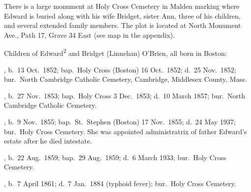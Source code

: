 There is a large monument at Holy Cross Cemetery in Malden marking where Edward is buried along with his wife Bridget, sister Ann, three of his children, and several extended family members. The plot is located at North Monument Ave., Path 17, Grave 34 East (see map in the appendix).\cite{Edward2OBrienGrave,CarolGordon}

\begin{KidsIntro}
	Children of Edward\textsuperscript{2} and Bridget (Linnehan) O'Brien, all born in Boston:
\end{KidsIntro}

\begin{Kids}
	, b.\ 13 Oct.\ 1852;\cite{MaryAnn3OBrienBirth} bap.\ Holy Cross (Boston) 16 Oct.\ 1852;\cite{MaryAnn3OBrienBaptism} d.\ 25 Nov.\ 1852;\cite{MaryAnn3OBrienDeath} bur.\ North Cambridge Catholic Cemetery, Cambridge, Middlesex County, Mass.\cite{DianaBerberenaLetter1}
	
	, b.\ 27 Nov.\ 1853;\cite{Ellen3OBrienBirth} bap.\ Holy Cross 3 Dec.\ 1853;\cite{Ellen3OBrienBaptism} d.\ 10 March 1857;\cite{Ellen3OBrienDeath} bur.\ North Cambridge Catholic Cemetery.\cite{DianaBerberenaLetter2}
	
	, b.\ 9 Nov.\ 1855;\cite{AnnMaria3OBrienBirth} bap.\ St.\ Stephen (Boston) 17 Nov.\ 1855\cite{AnnMaria3OBrienBaptism}; d.\ 24 May 1937;\cite{AnnMaria3OBrienDeath} bur.\ Holy Cross Cemetery.\cite{CarolGordon} She was appointed administratrix of father Edward's estate after he died intestate.\cite{Edward2OBrienProbate}
	
	, b.\ 22 Aug.\ 1859;\cite{Margaret3OBrienBaptism} bap.\ 29 Aug.\ 1859;\cite{Margaret3OBrienBaptism} d.\ 6 March 1933;\cite{Margaret3OBrienDeath} bur.\ Holy Cross Cemetery.\cite{CarolGordon}
	
	, b.\ 7 April 1861;\cite{Edward3OBrienBirth} d.\ 7 Jan.\ 1884 (typhoid fever);\cite{Edward3OBrienDeath} bur.\ Holy Cross Cemetery.\cite{CarolGordon}
\end{Kids}